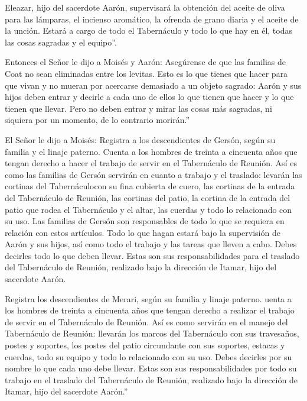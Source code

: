  Eleazar, hijo del sacerdote Aarón, supervisará la
obtención del aceite de oliva para las lámparas, el incienso aromático,
la ofrenda de grano diaria y el aceite de la unción. Estará a cargo de
todo el Tabernáculo y todo lo que hay en él, todas las cosas sagradas y
el equipo''.

 Entonces el Señor le dijo a Moisés y Aarón: 
Asegúrense de que las familias de Coat no sean eliminadas entre los
levitas.  Esto es lo que tienes que hacer para que vivan y
no mueran por acercarse demasiado a un objeto sagrado: Aarón y sus hijos
deben entrar y decirle a cada uno de ellos lo que tienen que hacer y lo
que tienen que llevar.  Pero no deben entrar y mirar las
cosas más sagradas, ni siquiera por un momento, de lo contrario
morirán.''

 El Señor le dijo a Moisés:  Registra a los
descendientes de Gersón, según su familia y el linaje paterno.
 Cuenta a los hombres de treinta a cincuenta años que
tengan derecho a hacer el trabajo de servir en el Tabernáculo de
Reunión.  Así es como las familias de Gersón servirán en
cuanto a trabajo y el traslado:  levarán las cortinas del
Tabernáculocon su fina cubierta de cuero, las cortinas de la entrada del
Tabernáculo de Reunión,  las cortinas del patio, la cortina
de la entrada del patio que rodea el Tabernáculo y el altar, las cuerdas
y todo lo relacionado con su uso. Las familias de Gersón son
responsables de todo lo que se requiera en relación con estos artículos.
 Todo lo que hagan estará bajo la supervisión de Aarón y
sus hijos, así como todo el trabajo y las tareas que lleven a cabo.
Debes decirles todo lo que deben llevar.  Estas son sus
responsabilidades para el traslado del Tabernáculo de Reunión, realizado
bajo la dirección de Itamar, hijo del sacerdote Aarón.

 Registra los descendientes de Merari, según su familia y
linaje paterno.  uenta a los hombres de treinta a cincuenta
años que tengan derecho a realizar el trabajo de servir en el
Tabernáculo de Reunión.  Así es como servirán en el manejo
del Tabernáculo de Reunión: llevarán los marcos del Tabernáculo con sus
travesaños, postes y soportes,  los postes del patio
circundante con sus soportes, estacas y cuerdas, todo su equipo y todo
lo relacionado con su uso. Debes decirles por su nombre lo que cada uno
debe llevar.  Estas son sus responsabilidades por todo su
trabajo en el traslado del Tabernáculo de Reunión, realizado bajo la
dirección de Itamar, hijo del sacerdote Aarón.''

